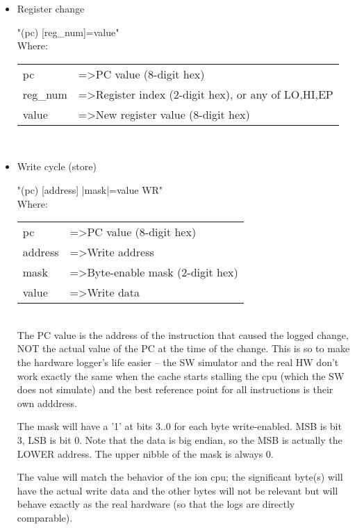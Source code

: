     \begin{itemize}
    \item Register change

        "(pc) [reg\_num]=value"\\

        Where:
            
        \begin{tabular}{ l l }
            pc       & =\textgreater PC value (8-digit hex)\\
            reg\_num & =\textgreater Register index (2-digit hex), or any of {LO,HI,EP}\\
            value    & =\textgreater New register value (8-digit hex)\\
        \end{tabular}\\
       

    \item Write cycle (store)

        "(pc) [address] |mask|=value WR"\\

        Where:
        
        \begin{tabular}{ l l }
        pc      & =\textgreater PC value (8-digit hex)\\
        address & =\textgreater Write address\\
        mask    & =\textgreater Byte-enable mask (2-digit hex)\\
        value   & =\textgreater Write data\\
        \end{tabular}\\

        The PC value is the address of the instruction that caused the logged
        change, NOT the actual value of the PC at the time of the change. 
        This is so to make the hardware logger's life easier -- the SW simulator
        and the real HW don't work exactly the same when the cache starts 
        stalling the cpu (which the SW does not simulate) and the best reference
        point for all instructions is their own adddress.

        The mask will have a '1' at bits 3..0 for each byte write-enabled. MSB
        is bit 3, LSB is bit 0. Note that the data is big endian, so the MSB
        is actually the LOWER address. The upper nibble of the mask is always 0.

        The value will match the behavior of the ion cpu; the significant
        byte(s) will have the actual write data and the other bytes will not
        be relevant but will behave exactly as the real hardware (so that the
        logs are directly comparable).


\end{itemize}
